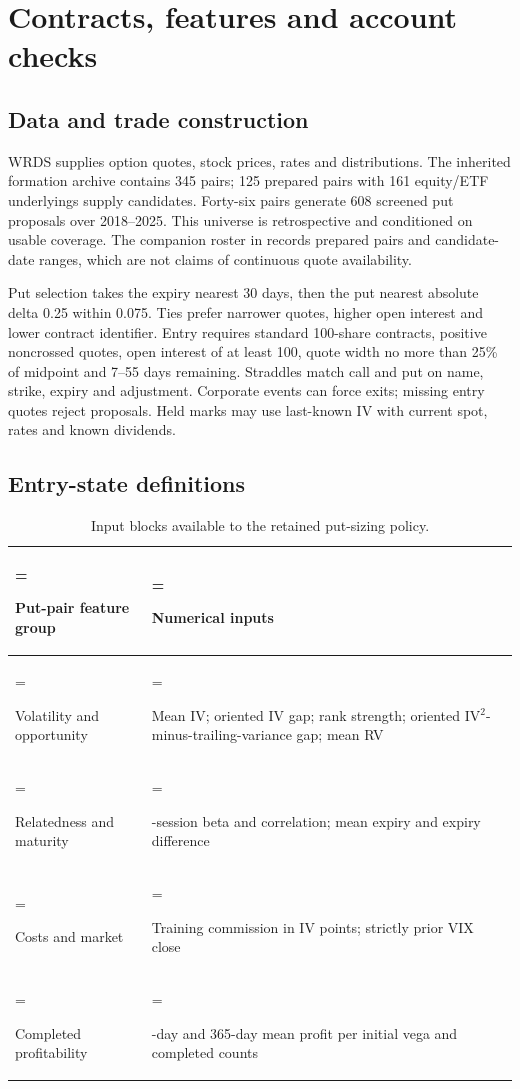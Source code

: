 \clearpage

\section{Contracts, features and account checks}\label{app:a}

\subsection*{Data and trade construction}

WRDS supplies option quotes, stock prices, rates and distributions. The inherited formation archive contains 345 pairs; 125 prepared pairs with 161 equity/ETF underlyings supply candidates. Forty-six pairs generate 608 screened put proposals over 2018--2025. This universe is retrospective and conditioned on usable coverage. The companion roster in  records prepared pairs and candidate-date ranges, which are not claims of continuous quote availability.


Put selection takes the expiry nearest 30 days, then the put nearest absolute delta 0.25 within 0.075. Ties prefer narrower quotes, higher open interest and lower contract identifier. Entry requires standard 100-share contracts, positive noncrossed quotes, open interest of at least 100, quote width no more than 25\% of midpoint and 7--55 days remaining. Straddles match call and put on name, strike, expiry and adjustment. Corporate events can force exits; missing entry quotes reject proposals. Held marks may use last-known IV with current spot, rates and known dividends.


\subsection*{Entry-state definitions}

\begin{table}[H]\centering\small
\caption{Input blocks available to the retained put-sizing policy.}
\setlength{\tabcolsep}{4pt}\renewcommand{\arraystretch}{1.18}
\begin{tabularx}{\textwidth}{@{}>{\hsize=0.69531\hsize\linewidth=\hsize\raggedright\arraybackslash}X>{\hsize=1.30469\hsize\linewidth=\hsize\raggedright\arraybackslash}X@{}}\toprule
\textbf{Put-pair feature group} & \textbf{Numerical inputs}\\\midrule
Volatility and opportunity & Mean IV; oriented IV gap; rank strength; oriented IV\(^{2}\)-minus-trailing-variance gap; mean RV\\
Relatedness and maturity & 126-session beta and correlation; mean expiry and expiry difference\\
Costs and market & Training commission in IV points; strictly prior VIX close\\
Completed profitability & 91-day and 365-day mean profit per initial vega and completed counts\\
\bottomrule\end{tabularx}\end{table}

